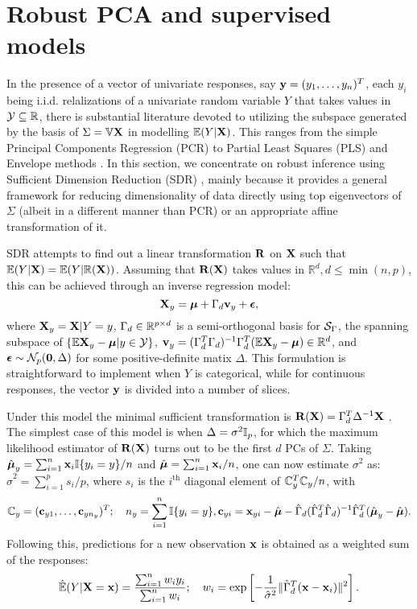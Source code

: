 \section{Robust PCA and supervised models}
\label{section:sdrSection}
In the presence of a vector of univariate responses, say ${\bf{y}} = (y_1,\ldots, y_n)^T$, each $y_i$ being i.i.d. relalizations of a univariate random variable $Y$ that takes values in $\mathcal{Y} \subseteq {\mathbb{R}}$, there is substantial literature devoted to utilizing the subspace generated by the basis of $\Sigma = {\mathbb{V}} {\mathbf{X}}$ in modelling ${\mathbb{E}}(Y|{\mathbf{X}})$. This ranges from the simple Principal Components Regression (PCR) to Partial Least Squares (PLS) and Envelope methods \citep{Cook10}. In this section, we concentrate on robust inference using Sufficient Dimension Reduction (SDR) \citep{AdragniCook09}, mainly because it provides a general framework for reducing dimensionality of data directly using top eigenvectors of $\Sigma$ (albeit in a different manner than PCR) or an appropriate affine transformation of it.

SDR attempts to find out a linear transformation ${\mathbf{R}}$ on ${\mathbf{X}}$ such that ${\mathbb{E}}(Y|{\mathbf{X}}) = {\mathbb{E}}(Y| {\mathbb{R}}({\mathbf{X}}))$. Assuming that ${\mathbf{R}}({\mathbf{X}})$ takes values in $\mathbb R^d, d \leq \min(n,p)$, this can be achieved through an inverse regression model:
%
\begin{equation}
{\mathbf{X}}_y = {\boldsymbol{\mu}} + \Gamma_d {\bf{v}}_y + {\boldsymbol{\epsilon}},
\end{equation}
%
where ${\mathbf{X}}_y = {\mathbf{X}}|Y=y$, $\Gamma_d \in {\mathbb{R}}^{p \times d}$ is a semi-orthogonal basis for $\mathcal{S}_\Gamma$, the spanning subspace of $\{ {\mathbb{E}} {\mathbf{X}}_y - {\boldsymbol{\mu}} | y \in \mathcal{Y} \}$, ${\bf{v}}_y = (\Gamma_d^T \Gamma_d)^{-1} \Gamma_d^T ({\mathbb{E}} {\mathbf{X}}_y - {\boldsymbol{\mu}}) \in \mathbb R^d$, and ${\boldsymbol{\epsilon}} \sim \mathcal{N}_p ({\bf 0}, \Delta)$ for some positive-definite matix $\Delta$. This formulation is straightforward to implement when $Y$ is categorical, while for continuous responses, the vector ${\bf{y}}$ is divided into a number of slices.

Under this model the minimal sufficient transformation is ${\mathbf{R}}({\mathbf{X}}) = \Gamma_d^T \Delta^{-1} {\mathbf{X}}$ \citep{AdragniCook09}. The simplest case of this model is when $\Delta = \sigma^2 {\mathbb{I}}_p$, for which the maximum likelihood estimator of $ {\mathbf{R}}({\mathbf{X}})$ turns out to be the first $d$ PCs of $\Sigma$. Taking $\hat {{\boldsymbol{\mu}}}_y = \sum_{i=1}^n {\bf{x}}_i {\mathbb{I}} \{y_i = y\}/n$ and $\hat {{\boldsymbol{\mu}}} = \sum_{i=1}^n {\bf{x}}_i /n$, one can now estimate $\sigma^2$ as: $\hat\sigma^2 = \sum_{i=1}^p s_i /p$, where $s_i$ is the $i^\text{th}$ diagonal element of ${\mathbb{C}}_y^T {\mathbb{C}}_y/n$, with
%
$$
{\mathbb{C}}_y = ({\bf{c}}_{y1}, \ldots, {\bf{c}}_{yn_y})^T; \quad
n_y = \sum_{i=1}^n {\mathbb{I}} \{ y_i = y \},
{\bf{c}}_{yi} = {\bf{x}}_{yi} - \hat {{\boldsymbol{\mu}}} - \hat\Gamma_d (\hat \Gamma_d^T \hat \Gamma_d)^{-1} \hat \Gamma_d^T (\hat {{\boldsymbol{\mu}}}_y - \hat {{\boldsymbol{\mu}}} ).
$$
%
Following this, predictions for a new observation ${\bf{x}}$ is obtained as a weighted sum of the responses:
%
$$
\hat {{\mathbb{E}}}(Y|{\mathbf{X}}={\bf{x}}) = \frac{\sum_{i=1}^n w_i y_i}{\sum_{i=1}^n w_i}; \quad w_i = \exp \left[ -\frac{1}{\hat\sigma^2}  \| \hat\Gamma_d^T ({\bf{x}} - {\bf{x}}_i) \|^2 \right].
$$
%

